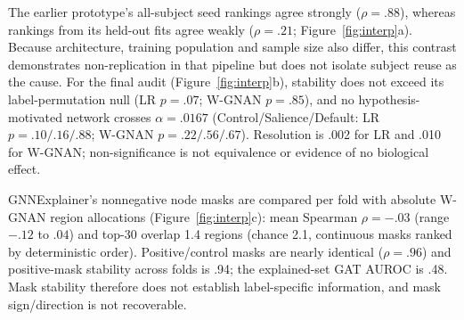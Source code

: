 The earlier prototype's all-subject seed rankings agree strongly ($\rho=.88$), whereas rankings from
its held-out fits agree weakly ($\rho=.21$; Figure~\ref{fig:interp}a). Because architecture, training population and sample size
also differ, this contrast demonstrates non-replication in that pipeline but does not isolate subject
reuse as the cause. For the final audit (Figure~\ref{fig:interp}b), stability does not exceed its label-permutation null (LR
$p=.07$; W-GNAN $p=.85$), and no hypothesis-motivated network crosses $\alpha=.0167$
(Control/Salience/Default: LR $p=.10/.16/.88$; W-GNAN $p=.22/.56/.67$). Resolution is .002 for LR
and .010 for W-GNAN; non-significance is not equivalence or evidence of no biological effect.

GNNExplainer's nonnegative node masks are compared per fold with absolute W-GNAN region allocations (Figure~\ref{fig:interp}c):
mean Spearman $\rho=-.03$ (range $-.12$ to $.04$) and top-30 overlap 1.4 regions (chance 2.1, continuous
masks ranked by deterministic order). Positive/control masks are nearly identical ($\rho=.96$) and
positive-mask stability across folds is .94; the explained-set GAT AUROC is .48. Mask
stability therefore does not establish label-specific information, and mask sign/direction is
not recoverable.
